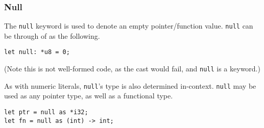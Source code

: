 \subsubsection{Null}

The \texttt{null} keyword is used to denote an empty pointer/function value.
\texttt{null} can be through of as the following.

\begin{lstlisting}[language=CustomLang]
let null: *u8 = 0;
\end{lstlisting}

(Note this is not well-formed code, as the cast would fail, and \texttt{null} is a keyword.)

As with numeric literals, \texttt{null}'s type is also determined in-context.
\texttt{null} may be used as any pointer type, as well as a functional type.

\begin{lstlisting}[language=CustomLang]
let ptr = null as *i32;
let fn = null as (int) -> int;
\end{lstlisting}
